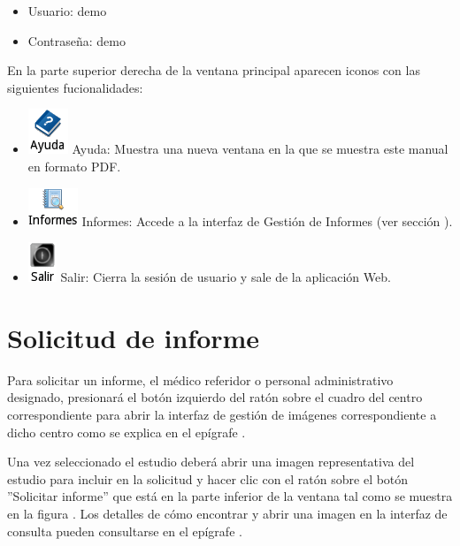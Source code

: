 \documentclass{plantilla-manual-usuario}
\begin{document}
\begin{itemize}
\item Usuario: demo
\item Contraseña: demo 
\end{itemize}

En la parte superior derecha de la ventana principal aparecen iconos con las siguientes fucionalidades:

\begin{itemize}
\item \includegraphics[scale=0.5]{images/boton-ayuda.png} Ayuda: Muestra una nueva ventana en la que se muestra este manual en formato PDF.
\item \includegraphics[scale=0.5]{images/boton-informes.png} Informes: Accede a la interfaz de Gestión de Informes (ver sección ).
\item \includegraphics[scale=0.5]{images/exit.png} Salir: Cierra la sesión de usuario y sale de la aplicación Web.
\end{itemize}

\section{Solicitud de informe}\label{subsectionSolicitarInforme}

Para solicitar un informe, el médico referidor o personal administrativo designado, presionará el botón izquierdo del ratón sobre el cuadro del centro correspondiente para abrir la interfaz de gestión de imágenes correspondiente a dicho centro como se explica en el epígrafe .

Una vez seleccionado el estudio deberá abrir una imagen representativa del estudio para incluir en la solicitud y hacer clic con el ratón sobre el botón  ”Solicitar informe” que está en la parte inferior de la ventana tal como se muestra en la figura . Los detalles de cómo encontrar y abrir una imagen en la interfaz de consulta pueden consultarse en el epígrafe .
\end{document}
